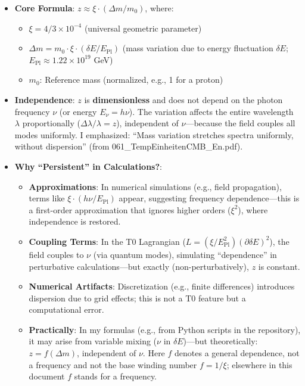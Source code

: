 	\begin{itemize}
		\item \textbf{Core Formula}: $z \approx \xi \cdot (\Delta m / m_0)$, where:
		\begin{itemize}
			\item $\xi = 4/3 \times 10^{-4}$ (universal geometric parameter)
			\item $\Delta m = m_0 \cdot \xi \cdot (\delta E / E_{\mathrm{Pl}})$ (mass variation due to energy fluctuation $\delta E$; $E_{\mathrm{Pl}} \approx 1.22 \times 10^{19}$ GeV)
			\item $m_0$: Reference mass (normalized, e.g., 1 for a proton)
		\end{itemize}
		\item \textbf{Independence}: $z$ is \textbf{dimensionless} and does not depend on the photon frequency $\nu$ (or energy $E_\nu = h\nu$). The variation affects the entire wavelength $\lambda$ proportionally ($\Delta\lambda / \lambda = z$), independent of $\nu$—because the field couples all modes uniformly. I emphasized: ``Mass variation stretches spectra uniformly, without dispersion'' (from 061\_TempEinheitenCMB\_En.pdf).
		\item \textbf{Why ``Persistent'' in Calculations?}:
		\begin{itemize}
			\item \textbf{Approximations}: In numerical simulations (e.g., field propagation), terms like $\xi \cdot (h\nu / E_{\mathrm{Pl}})$ appear, suggesting frequency dependence—this is a first-order approximation that ignores higher orders ($\xi^2$), where independence is restored.
			\item \textbf{Coupling Terms}: In the T0 Lagrangian ($L = (\xi / E_{\mathrm{Pl}}^2) (\partial \delta E)^2$), the field couples to $\nu$ (via quantum modes), simulating ``dependence'' in perturbative calculations—but exactly (non-perturbatively), $z$ is constant.
			\item \textbf{Numerical Artifacts}: Discretization (e.g., finite differences) introduces dispersion due to grid effects; this is not a T0 feature but a computational error.
			\item \textbf{Practically}: In my formulas (e.g., from Python scripts in the repository), it may arise from variable mixing ($\nu$ in $\delta E$)—but theoretically: $z = f(\Delta m)$, independent of $\nu$. Here $f$ denotes a general dependence, not a frequency and not the base winding number $f = 1/\xi$; elsewhere in this document $f$ stands for a frequency.
		\end{itemize}
	\end{itemize}

